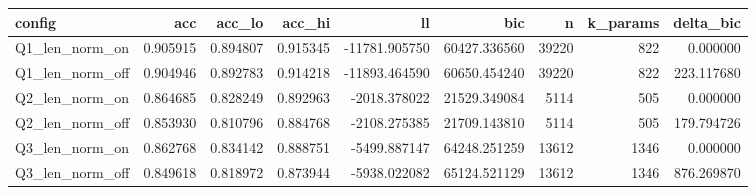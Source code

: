 \begin{tabular}{lrrrrrrrr}
\toprule
config & acc & acc\_lo & acc\_hi & ll & bic & n & k\_params & delta\_bic \\
\midrule
Q1\_len\_norm\_on & 0.905915 & 0.894807 & 0.915345 & -11781.905750 & 60427.336560 & 39220 & 822 & 0.000000 \\
Q1\_len\_norm\_off & 0.904946 & 0.892783 & 0.914218 & -11893.464590 & 60650.454240 & 39220 & 822 & 223.117680 \\
Q2\_len\_norm\_on & 0.864685 & 0.828249 & 0.892963 & -2018.378022 & 21529.349084 & 5114 & 505 & 0.000000 \\
Q2\_len\_norm\_off & 0.853930 & 0.810796 & 0.884768 & -2108.275385 & 21709.143810 & 5114 & 505 & 179.794726 \\
Q3\_len\_norm\_on & 0.862768 & 0.834142 & 0.888751 & -5499.887147 & 64248.251259 & 13612 & 1346 & 0.000000 \\
Q3\_len\_norm\_off & 0.849618 & 0.818972 & 0.873944 & -5938.022082 & 65124.521129 & 13612 & 1346 & 876.269870 \\
\bottomrule
\end{tabular}
